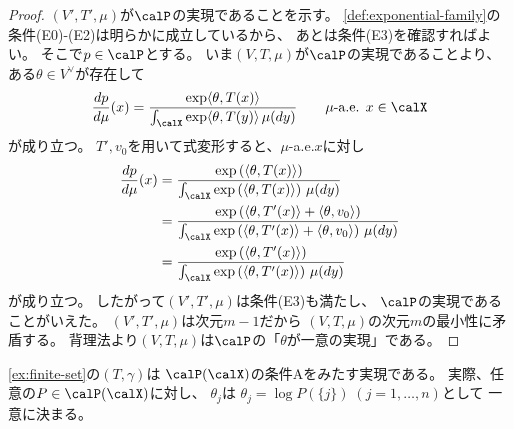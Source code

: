 \documentclass[report]{jlreq}
\begin{document}
\begin{proof}
    $(V', T', \mu)$が$\calP$の実現であることを示す。
    \cref{def:exponential-family}の条件(E0)-(E2)は明らかに成立しているから、
    あとは条件(E3)を確認すればよい。
    そこで$p \in \calP$とする。
    いま$(V, T, \mu)$が$\calP$の実現であることより、
    ある$\theta \in V^\vee$が存在して
    \begin{equation}
        \dd[p]{\mu}(x)
            = \frac{
                \exp\langle \theta, T(x) \rangle
            }{
                \int_{\calX} \exp\langle \theta, T(y) \rangle \, \mu(dy)
            }
            \qquad
            \text{$\mu$-a.e. $x \in \calX$}
    \end{equation}
    が成り立つ。
    $T', v_0$を用いて式変形すると、$\mu$-a.e.$x$に対し
    \begin{alignat}{1}
        \dd[p]{\mu}(x)
            &= \frac{
                \exp\myparen{
                    \langle \theta, T(x) \rangle
                }
            }{
                \int_{\calX} \exp\myparen{
                    \langle \theta, T(x) \rangle
                } \, \mu(dy)
            } \\
            &= \frac{
                \exp\myparen{
                    \langle \theta, T'(x) \rangle
                    + \langle \theta, v_0 \rangle
                }
            }{
                \int_{\calX} \exp\myparen{
                    \langle \theta, T'(x) \rangle
                    + \langle \theta, v_0 \rangle
                } \, \mu(dy)
            } \\
            &= \frac{
                \exp\myparen{
                    \langle \theta, T'(x) \rangle
                }
            }{
                \int_{\calX} \exp\myparen{
                    \langle \theta, T'(x) \rangle
                } \, \mu(dy)
            }
    \end{alignat}
    が成り立つ。
    したがって$(V', T', \mu)$は条件(E3)も満たし、
    $\calP$の実現であることがいえた。
    $(V', T', \mu)$は次元$m - 1$だから
    $(V, T, \mu)$の次元$m$の最小性に矛盾する。
    背理法より$(V, T, \mu)$は$\calP$の「$\theta$が一意の実現」である。
\end{proof}

\begin{example}
    \cref{ex:finite-set}の$(T, \gamma)$は
    $\calP(\calX)$の条件Aをみたす実現である。
    実際、任意の$P \in \calP(\calX)$に対し、
    $\theta_j$は
    $\theta_j = \log P(\{ j \}) \; (j = 1, \dots, n)$として
    一意に決まる。
\end{example}
\end{document}
